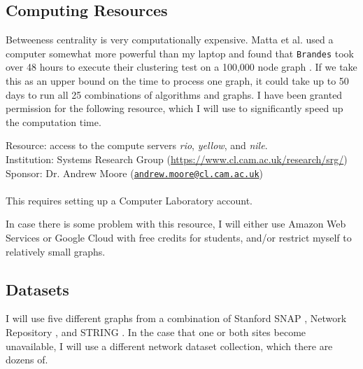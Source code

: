 \documentclass[a4paper,12pt]{article}
\newcommand{\email}[1]{\href{mailto:#1}{\nolinkurl{#1}}}
\begin{document}
\subsection*{Computing Resources} %

Betweeness centrality is very computationally expensive. Matta et al. used a computer somewhat more powerful than my laptop and found that \verb|Brandes| took over 48 hours to execute their clustering test on a 100,000 node graph \cite{comparesmall}. If we take this as an upper bound on the time to process one graph, it could take up to 50 days to run all 25 combinations of algorithms and graphs. I have been granted permission for the following resource, which I will use to significantly speed up the computation time.

{\begin{adjustwidth}{1cm}{0cm}
\noindent
Resource: access to the compute servers \textit{rio}, \textit{yellow}, and \textit{nile}.\\
Institution: Systems Research Group (\url{https://www.cl.cam.ac.uk/research/srg/})\\
Sponsor: Dr. Andrew Moore (\email{andrew.moore@cl.cam.ac.uk})\\ \\
This requires setting up a Computer Laboratory account.
\end{adjustwidth}
}

In case there is some problem with this resource, I will either use Amazon Web Services or Google Cloud with free credits for students, and/or restrict myself to relatively small graphs.
\subsection*{Datasets}
I will use five different graphs from a combination of Stanford SNAP \cite{snap}, Network Repository \cite{repository}, and STRING \cite{string}. In the case that one or both sites become unavailable, I will use a different network dataset collection, which there are dozens of.


\newpage


\end{document}
